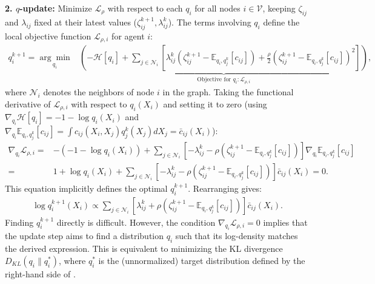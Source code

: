 \textbf{2. $q$-update:} Minimize ${\mathcal{L}}_{\rho}$ with respect to each $q_i$ for all nodes $i \in {\mathcal{V}}$, keeping $\zeta_{ij}$ and $\lambda_{ij}$ fixed at their latest values ($\zeta_{ij}^{k+1}, \lambda_{ij}^k$). The terms involving $q_i$ define the local objective function ${\mathcal{L}}_{\rho, i}$ for agent $i$:
\begin{equation}
\begin{aligned}
q_i^{k+1} = \underset{q_i}{\arg\min} & \underbrace{\left( -{\mathcal{H}}[q_i] + \sum_{j \in {\mathcal{N}}_i} \left[ \lambda_{ij}^k (\zeta_{ij}^{k+1} - \mathbb{E}_{q_i, q_j^k}[c_{ij}]) + \frac{\rho}{2} (\zeta_{ij}^{k+1} - \mathbb{E}_{q_i, q_j^k}[c_{ij}])^2 \right] \right)}_{\text{Objective for } q_i: {\mathcal{L}}_{\rho, i}},
\label{eq:admm_q_update_min}
\end{aligned}
\end{equation}
where ${\mathcal{N}}_i$ denotes the neighbors of node $i$ in the graph. Taking the functional derivative of ${\mathcal{L}}_{\rho, i}$ with respect to $q_i(X_i)$ and setting it to zero (using $\nabla_{q_i} {\mathcal{H}}[q_i] = -1 - \log q_i(X_i)$ and $\nabla_{q_i} \mathbb{E}_{q_i, q_j^k}[c_{ij}] = \int c_{ij}(X_i, X_j) q_j^k(X_j) dX_j = \bar{c}_{ij}(X_i)$):
\begin{equation}
\begin{aligned}
\nabla_{q_i} {\mathcal{L}}_{\rho, i} = & -(-1 - \log q_i(X_i)) + \sum_{j \in {\mathcal{N}}_i} [-\lambda_{ij}^k - \rho(\zeta_{ij}^{k+1} - \mathbb{E}_{q_i, q_j^k}[c_{ij}])] \nabla_{q_i} \mathbb{E}_{q_i, q_j^k}[c_{ij}] \\
= & 1 + \log q_i(X_i) + \sum_{j \in {\mathcal{N}}_i} [-\lambda_{ij}^k - \rho(\zeta_{ij}^{k+1} - \mathbb{E}_{q_i, q_j^k}[c_{ij}])] \bar{c}_{ij}(X_i) = 0.
\label{eq:admm_q_deriv}
\end{aligned}
\end{equation}
This equation implicitly defines the optimal $q_i^{k+1}$. Rearranging gives:
\begin{equation}
\begin{aligned}
\log q_i^{k+1}(X_i) \propto \sum_{j \in {\mathcal{N}}_i} [\lambda_{ij}^k + \rho(\zeta_{ij}^{k+1} - \mathbb{E}_{q_i, q_j^k}[c_{ij}])] \bar{c}_{ij}(X_i).
\label{eq:admm_q_solution_form}
\end{aligned}
\end{equation}
Finding $q_i^{k+1}$ directly is difficult. However, the condition $\nabla_{q_i} {\mathcal{L}}_{\rho, i} = 0$ implies that the update step aims to find a distribution $q_i$ such that its log-density matches the derived expression. This is equivalent to minimizing the KL divergence $D_{KL}(q_i \| q_i^*)$, where $q_i^*$ is the (unnormalized) target distribution defined by the right-hand side of .
